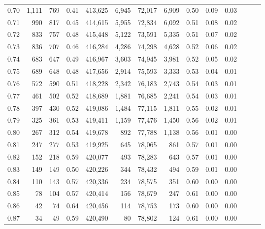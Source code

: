 \begin{tabular}{rrrrrrrrrrrrrr}
0.70 &   1,111 &    769 &  0.41 &  413,625 &    6,945 &  72,017 &   6,909 &  0.50 &  0.09 &      0.03 \\
0.71 &     990 &    817 &  0.45 &  414,615 &    5,955 &  72,834 &   6,092 &  0.51 &  0.08 &      0.02 \\
0.72 &     833 &    757 &  0.48 &  415,448 &    5,122 &  73,591 &   5,335 &  0.51 &  0.07 &      0.02 \\
0.73 &     836 &    707 &  0.46 &  416,284 &    4,286 &  74,298 &   4,628 &  0.52 &  0.06 &      0.02 \\
0.74 &     683 &    647 &  0.49 &  416,967 &    3,603 &  74,945 &   3,981 &  0.52 &  0.05 &      0.02 \\
0.75 &     689 &    648 &  0.48 &  417,656 &    2,914 &  75,593 &   3,333 &  0.53 &  0.04 &      0.01 \\
0.76 &     572 &    590 &  0.51 &  418,228 &    2,342 &  76,183 &   2,743 &  0.54 &  0.03 &      0.01 \\
0.77 &     461 &    502 &  0.52 &  418,689 &    1,881 &  76,685 &   2,241 &  0.54 &  0.03 &      0.01 \\
0.78 &     397 &    430 &  0.52 &  419,086 &    1,484 &  77,115 &   1,811 &  0.55 &  0.02 &      0.01 \\
0.79 &     325 &    361 &  0.53 &  419,411 &    1,159 &  77,476 &   1,450 &  0.56 &  0.02 &      0.01 \\
0.80 &     267 &    312 &  0.54 &  419,678 &      892 &  77,788 &   1,138 &  0.56 &  0.01 &      0.00 \\
0.81 &     247 &    277 &  0.53 &  419,925 &      645 &  78,065 &     861 &  0.57 &  0.01 &      0.00 \\
0.82 &     152 &    218 &  0.59 &  420,077 &      493 &  78,283 &     643 &  0.57 &  0.01 &      0.00 \\
0.83 &     149 &    149 &  0.50 &  420,226 &      344 &  78,432 &     494 &  0.59 &  0.01 &      0.00 \\
0.84 &     110 &    143 &  0.57 &  420,336 &      234 &  78,575 &     351 &  0.60 &  0.00 &      0.00 \\
0.85 &      78 &    104 &  0.57 &  420,414 &      156 &  78,679 &     247 &  0.61 &  0.00 &      0.00 \\
0.86 &      42 &     74 &  0.64 &  420,456 &      114 &  78,753 &     173 &  0.60 &  0.00 &      0.00 \\
0.87 &      34 &     49 &  0.59 &  420,490 &       80 &  78,802 &     124 &  0.61 &  0.00 &      0.00 \\

\end{tabular}
